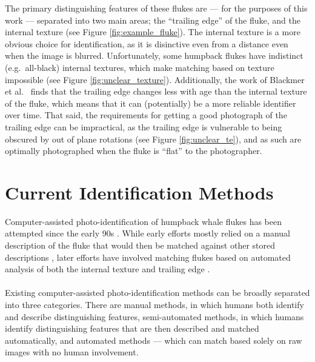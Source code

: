 The primary distinguishing features of these flukes are --- for the purposes of this work --- separated into two main areas; the ``trailing edge'' of the fluke, and the internal texture (see Figure \ref{fig:example_fluke}).
The internal texture is a more obvious choice for identification, as it is disinctive even from a distance even when the image is blurred.
Unfortunately, some humpback flukes have indistinct (e.g.\ all-black) internal textures, which make matching based on texture impossible (see Figure \ref{fig:unclear_texture}).
Additionally, the work of Blackmer et al.\ \cite{blackmer2000temporal} finds that the trailing edge changes less with age than the internal texture of the fluke, which means that it can (potentially) be a more reliable identifier over time.
That said, the requirements for getting a good photograph of the trailing edge can be impractical, as the trailing edge is vulnerable to being obscured by out of plane rotations (see Figure \ref{fig:unclear_te}), and as such are optimally photographed when the fluke is ``flat'' to the photographer.


\section{Current Identification Methods}

Computer-assisted photo-identification of humpback whale flukes has been attempted since the early 90s \cite{mizroch1990computer}.
While early efforts mostly relied on a manual description of the fluke that would then be matched against other stored descriptions \cite{mizroch1990computer, whitehead1990computer}, later efforts have involved matching flukes based on automated analysis of both the internal texture and trailing edge \cite{hughes2015automated, kniest2010fluke, i3scontour}.
\\\\
Existing computer-assisted photo-identification methods can be broadly separated into three categories.
There are manual methods, in which humans both identify and describe distinguishing features, semi-automated methods, in which humans identify distinguishing features that are then described and matched automatically, and automated methods --- which can match based solely on raw images with no human involvement. 


